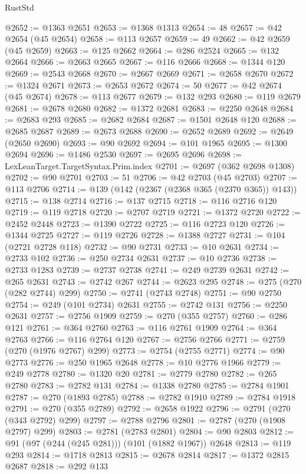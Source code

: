 \begin{lexlean}{RustStd}
\begin{coremodule}
@2652 := @1363 @2651
@2653 := @1368 @1313
@2654 := 48
@2657 := @42 @2654 (@45 @2654)
@2658 := @113 @2657
@2659 := 49
@2662 := @42 @2659 (@45 @2659)
@2663 := @125 @2662
@2664 := @286 @2524
@2665 := @132 @2664
@2666 := @2663 @2665
@2667 := @116 @2666
@2668 := @1344 @120
@2669 := @2543 @2668
@2670 := @2667 @2669
@2671 := @2658 @2670
@2672 := @1324 @2671
@2673 := @2653 @2672
@2674 := 50
@2677 := @42 @2674 (@45 @2674)
@2678 := @113 @2677
@2679 := @132 @293
@2680 := @119 @2679
@2681 := @2678 @2680
@2682 := @1372 @2681
@2683 := @2250 @2648
@2684 := @2683 @293
@2685 := @2682 @2684
@2687 := @1501 @2648 @120
@2688 := @2685 @2687
@2689 := @2673 @2688
@2690 := @2652 @2689
@2692 := @2649 (@2650 @2690)
@2693 := @90 @2692
@2694 := @101 @1965
@2695 := @1300 @2694
@2696 := @1486 @2530
@2697 := @2695 @2696
@2698 := LexLeanTarget.TargetSyntax.Prim.index
@2701 := @2697 (@362 @2698 @1308)
@2702 := @90 @2701
@2703 := 51
@2706 := @42 @2703 (@45 @2703)
@2707 := @113 @2706
@2714 := @139 (@142 (@2367 (@2368 @365 (@2370 @365)) @143))
@2715 := @138 @2714
@2716 := @137 @2715
@2718 := @116 @2716 @120
@2719 := @119 @2718
@2720 := @2707 @2719
@2721 := @1372 @2720
@2722 := @2452 @2448
@2723 := @1390 @2722
@2725 := @116 @2723 @120
@2726 := @1344 @2725
@2727 := @119 @2726
@2728 := @1388 @2727
@2731 := @104 (@2721 @2728 @118)
@2732 := @90 @2731
@2733 := @10 @2631
@2734 := @2733 @102
@2736 := @250 @2734 @2631
@2737 := @10 @2736
@2738 := @2733 @1283
@2739 := @2737 @2738
@2741 := @249 @2739 @2631
@2742 := @265 @2631
@2743 := @2742 @267
@2744 := @2623 @295
@2748 := @275 (@270 (@282 @2744) @299)
@2750 := @2741 (@2743 @2748)
@2751 := @90 @2750
@2754 := @249 (@101 @2734) @2631
@2755 := @2742 @131
@2756 := @2250 @2631
@2757 := @2756 @1909
@2759 := @270 (@355 @2757)
@2760 := @286 @121
@2761 := @364 @2760
@2763 := @116 @2761 @1909
@2764 := @364 @2763
@2766 := @116 @2764 @120
@2767 := @2756 @2766
@2771 := @2759 (@270 (@1976 @2767) @299)
@2773 := @2754 (@2755 @2771)
@2774 := @90 @2773
@2776 := @250 @1965 @2648
@2778 := @10 @2776 @1966
@2779 := @249 @2778
@2780 := @1320 @20
@2781 := @2779 @2780
@2782 := @265 @2780
@2783 := @2782 @131
@2784 := @1338 @2780
@2785 := @2784 @1901
@2787 := @270 (@1893 @2785)
@2788 := @2782 @1910
@2789 := @2784 @1918
@2791 := @270 (@355 @2789)
@2792 := @2658 @1922
@2796 := @2791 (@270 (@343 @2792) @299)
@2797 := @2788 @2796
@2801 := @2787 (@270 (@1908 @2797) @299)
@2803 := @2781 (@2783 @2801)
@2804 := @90 @2803
@2812 := @91 (@97 (@244 (@245 @281))) (@101 (@1882 @1967)) @2648
@2813 := @119 @293
@2814 := @1718 @2813
@2815 := @2678 @2814
@2817 := @1372 @2815 @2687
@2818 := @292 @133

\end{coremodule}
\end{lexlean}
